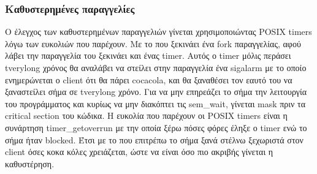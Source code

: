 \documentclass{article}
\begin{document}
\subsubsection{Καθυστερημένες παραγγελίες}
\label{late}
Ο έλεγχος των καθυστερημένων παραγγελιών γίνεται χρησιμοποιώντας POSIX timers λόγω των ευκολιών που παρέχουν.
Με το που ξεκινάει ένα fork παραγγελίας, αφού λάβει την παραγγελία του ξεκινάει και ένας timer. Αυτός ο timer μόλις περάσει tverylong χρόνος θα αναλάβει να στείλει στην παραγγελία ένα sigalarm με το οποίο ενημερώνεται ο client ότι θα πάρει cocacola, και θα ξαναθέσει τον εαυτό του να ξαναστείλει σήμα σε tverylong χρόνο. Για να μην επηρεάζει το σήμα την λειτουργία του προγράμματος και κυρίως να μην διακόπτει τις sem\_wait, γίνεται mask πριν τα critical section του κώδικα. Η ευκολία που παρέχουν οι POSIX timers είναι η συνάρτηση timer\_getoverrun με την οποία ξέρω πόσες φόρες έληξε ο timer ενώ το σήμα ήταν blocked. Έτσι με το που επιτρέπω το σήμα ξανά στέλνω ξεχωριστά στον client όσες κοκα κόλες χρειάζεται, ώστε να είναι όσο πιο ακριβής γίνεται η καθυστέρηση.
\end{document}
